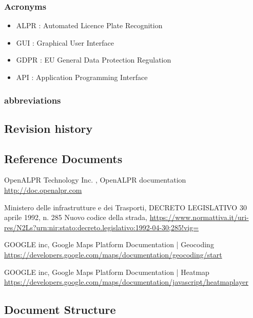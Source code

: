 \subsubsection{Acronyms}
\begin{itemize}
  \item ALPR : Automated Licence Plate Recognition
  \item GUI : Graphical User Interface
  \item GDPR : EU General Data Protection Regulation
  \item API : Application Programming Interface
\end{itemize}

\subsubsection{abbreviations}


\subsection{Revision history}


\subsection{Reference Documents}
\begin{thebibliography}{00}
OpenALPR Technology Inc. ,
OpenALPR documentation \url{http://doc.openalpr.com}

 Ministero delle infrastrutture e dei Trasporti,
DECRETO LEGISLATIVO 30 aprile 1992, n. 285 Nuovo codice della strada,
 \url{https://www.normattiva.it/uri-res/N2Ls?urn:nir:stato:decreto.legislativo:1992-04-30;285!vig=}

 GOOGLE inc,
 Google Maps Platform Documentation | Geocoding
 \url{https://developers.google.com/maps/documentation/geocoding/start}

 GOOGLE inc,
 Google Maps Platform Documentation | Heatmap
 \url{https://developers.google.com/maps/documentation/javascript/heatmaplayer}

\end{thebibliography}


\subsection{Document Structure}
